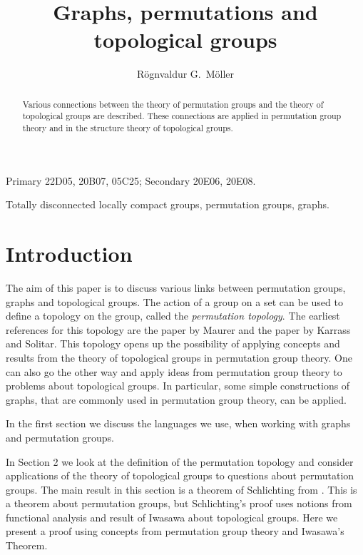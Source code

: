 \documentclass{emsprocart}
\title[Graphs, permutations, and topological groups]{Graphs, permutations and topological groups}
\author[R\"ognvaldur G.~M\"oller]{R\"ognvaldur G.~M\"oller}
\theoremstyle{definition}
\begin{document}
\begin{abstract}
Various connections between the theory of permutation groups and the theory of topological groups are described.  These connections are applied in permutation group theory and in the structure theory of topological groups.
\end{abstract}

\begin{classification}
Primary 22D05, 20B07, 05C25; Secondary  20E06, 20E08.
\end{classification}

\begin{keywords}
Totally disconnected locally compact groups, permutation groups, graphs.
\end{keywords}

\maketitle

\section*{Introduction}

The aim of this paper is to discuss various links between  permutation groups, graphs and topological groups.  The action of a group on a set can be used to define a topology on the group, called the {\em permutation topology}.  The earliest references for this topology are the paper \cite{Maurer1955} by Maurer and the paper \cite{KarrassSolitar1956} by Karrass and Solitar.  This topology opens up the possibility of applying concepts and results  from the theory of topological groups in permutation group theory.  One can also go the other way and apply ideas from permutation group theory to problems about topological groups.  In particular, some simple constructions of graphs, that are commonly used in permutation group theory, can be applied.

In the first section we discuss the languages we use, when working with graphs and permutation groups.

In Section 2 we look at the definition of the permutation topology and
consider applications of the theory of topological groups to questions
about permutation groups.  The main result in this section is a
theorem of Schlichting from \cite{Schlichting1980}.  This is a theorem
about permutation groups, but Schlichting's proof uses notions from
functional analysis and result of Iwasawa \cite{Iwasawa1951} about
topological groups.  Here we present a proof using concepts from
permutation group theory and  Iwasawa's Theorem.
\end{document}
